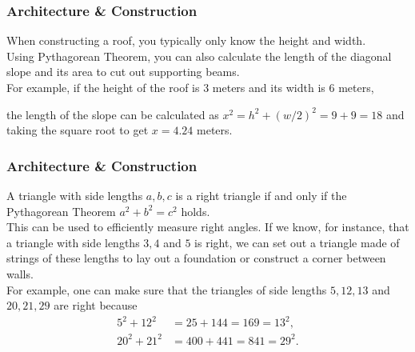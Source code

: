\documentclass[aspectratio=169,11pt,svgnames,handout]{beamer}
\newcommand{\clc}{\textcolor{PolygonCyan}}
\newcommand{\clo}{\textcolor{PolygonOrange}}
\begin{document}
\begin{frame}
 \frametitle{Architecture \& Construction}
 When constructing a roof, you typically only know the \clc{height} and
 \clo{width}.\\
 \pause 
 Using Pythagorean Theorem, you can also calculate the length of the diagonal
 slope and its area to cut out supporting beams.\\
 \pause
 For example, if the \clc{height} of the roof is 3 meters and its \clo{width} is
 6 meters,
 \begin{center}
 \end{center}
 the length of the slope can be calculated as $x^2 = h^2 + (w / 2)^2 = 9 + 9 =
 18$ and taking the square root to get $x = 4.24$ meters.
\end{frame}

\begin{frame}
 \frametitle{Architecture \& Construction}
 A triangle with side lengths $a,b,c$ is a right triangle if and only if the
 Pythagorean Theorem $a^2 + b^2 = c^2$ holds.\\
 \pause
 This can be used to efficiently measure right angles. If we know, for instance,
 that a triangle with side lengths $3,4$ and $5$ is right, we can set out a
 triangle made of strings of these lengths to lay out a foundation or construct
 a corner between walls.\\
 \pause
 For example, one can make sure that the triangles of side lengths $5,12,13$ and
 $20,21,29$ are right because
 \begin{align*}
  5^2 + 12^2 &= 25 + 144 = 169 = 13^2,\\
  20^2 + 21^2 &= 400 + 441 = 841 = 29^2.
 \end{align*}
\end{frame}
\end{document}
